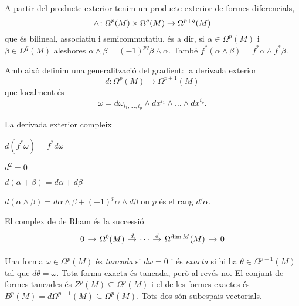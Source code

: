 \documentclass[12pt,twocolumn]{article}
\begin{document}
A partir del producte exterior tenim un producte exterior de formes diferencials,
\begin{equation*}
	\wedge \colon \Omega^p(M) \times \Omega^q(M) \to \Omega^{p+q}(M) \\
\end{equation*}
que és bilineal, associatiu i semicommutatiu, és a dir, si \( \alpha \in \Omega^p(M) \) i
\( \beta \in \Omega^q(M)\) aleshores \( \alpha \wedge \beta = (-1)^{pq} \beta \wedge
\alpha \). També \( f^\ast(\alpha \wedge \beta) = f^\ast \alpha \wedge f^\ast \beta \). 

Amb això definim una generalització del gradient: la derivada exterior
\begin{equation*}
	d \colon \Omega^p(M) \to \Omega^{p+1}(M)
\end{equation*}
que localment és
\begin{equation*}
	\omega = d\omega_{i_1, \dots, i_p} \wedge dx^{i_1} \wedge \dots \wedge dx^{i_p}.
\end{equation*}

\begin{proposition}
	La derivada exterior compleix
	\begin{points}
	\item \( d(f^\ast \omega) = f^\ast d\omega \)
	\item \( d^2 = 0 \)
	\item \( d(\alpha + \beta) = d\alpha + d\beta \)
	\item \( d(\alpha \wedge \beta) = d\alpha \wedge \beta + (-1)^p \alpha \wedge d\beta \)
		on \( p \) és el rang \( d'\alpha \). 
	\end{points}
\end{proposition}

\begin{definition}
	El complex de de Rham és la successió
	\begin{equation*}
		\begin{tikzcd}[column sep = 10] 
			0 \arrow[r] & \Omega^0(M) \arrow[r, "d"] & \cdots \arrow[r, "d"] & \Omega^{\dim
			M}(M) \arrow[r] & 0
		\end{tikzcd}
	\end{equation*}
\end{definition}

\begin{definition}
	Una forma \( \omega \in \Omega^p(M) \) és \emph{tancada} si \( d\omega = 0 \) i és
	\emph{exacta} si hi ha \( \theta \in \Omega^{p-1}(M) \) tal que \( d\theta = \omega \).
	Tota forma exacta és tancada, però al revés no. El conjunt de formes tancades és \(
	Z^p(M) \subseteq \Omega^p(M) \) i el de les formes exactes és \( B^p(M) = d\Omega^{p-1}(M)
	\subseteq \Omega^p(M) \). Tots dos són subespais vectorials. 
\end{definition}
\end{document}
